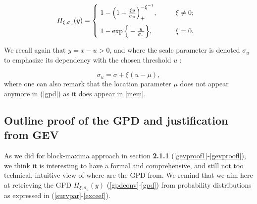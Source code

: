 \documentclass[11pt,a4paper,openany ]{book}
\begin{document}
\begin{equation}\label{gpdeq}
H_{\xi,\sigma_u}(y)=
\renewcommand{\arraystretch}{0.6}\left\{\begin{array}{@{}l@{\quad}l@{}}
\ 1-\Big(1+\frac{\xi y}{\sigma_u}\Big)_+^{-\xi^{-1}}, \ \ \ \ \ \  \ \ \xi\neq 0; \\ 
\vspace{0.0002cm} \\
\ 1-\exp\Big\{-\frac{y}{\sigma_u}\Big\}, \ \ \ \ \ \ \ \ \ \ \xi=0.

\end{array}\right.\kern-\nulldelimiterspace
\end{equation}


We recall again that $y = x-u >0$, and where the scale parameter is denoted $\sigma_u$ to emphasize its dependency with the chosen threshold $u$ :

\begin{equation}
\sigma_{u}=\sigma+\xi (u-\mu),
\end{equation}
where one can also remark that the location parameter $\mu$ does not appear anymore in (\ref{gpd}) as it does appear in \ref{mem}. 

\subsection{Outline proof of the GPD and justification from GEV} As we did for block-maxima approach in section \textbf{2.1.1} (\ref{gevproof1}-\ref{gevproofl}), we think it is interesting to have a formal and comprehensive, and still not too technical, intuitive view of where are the GPD from. We remind that we aim here at retrieving the GPD $H_{\xi,\sigma_u}(y)$ (\ref{gpdconv}-\ref{gpd}) from probability distributions as expressed in (\ref{survpar}-\ref{exceef}).
\end{document}
